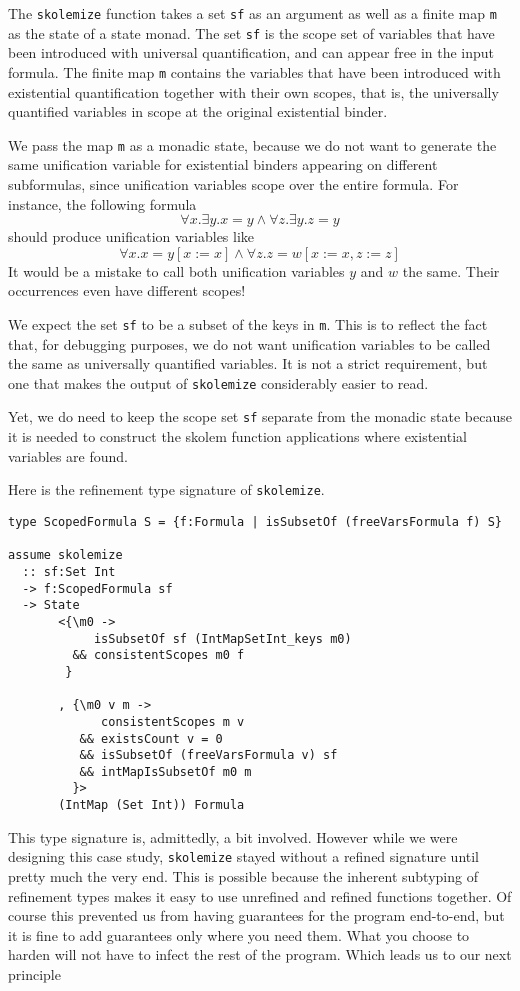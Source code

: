 \documentclass[sigconf, review]{acmart}
\newcommand{\tc}[1]{{\small\texttt{#1}}}
\begin{document}
The \tc{skolemize} function takes a set \tc{sf} as an argument as well as a
finite map \tc{m} as the state of a state monad. The set \tc{sf} is the scope set
of variables that have been
introduced with universal quantification, and can appear free in the
input formula. The finite map \tc{m} contains the variables
that have been introduced with existential quantification together with their own
scopes, that is, the universally quantified variables in scope at the original existential
binder.

We pass the map \tc{m} as a monadic state, because we do not
want to generate the same unification variable for existential binders appearing
on different subformulas, since unification variables scope over the entire formula. For instance, the following formula
$$\forall x. \exists y. x = y \land \forall z. \exists y. z = y$$
should produce unification variables like
$$\forall x. x = y[x:=x] \land \forall z. z = w[x:=x, z:=z]$$
It would be a mistake to call both unification variables $y$ and $w$ the same.
Their occurrences even have different scopes!

We expect the set \tc{sf} to be a subset of the keys in \tc{m}. This is to reflect the
fact that, for debugging purposes, we do not want unification variables to be called the same as
universally quantified variables. It is not a strict requirement, but one
that makes the output of \tc{skolemize} considerably easier to read.

Yet, we do need to keep the scope set \tc{sf} separate from the monadic
state because it is needed to construct the skolem function applications where
existential variables are found.

Here is the refinement type signature of \tc{skolemize}.
\begin{verbatim}
type ScopedFormula S = {f:Formula | isSubsetOf (freeVarsFormula f) S}

assume skolemize
  :: sf:Set Int
  -> f:ScopedFormula sf
  -> State
       <{\m0 ->
            isSubsetOf sf (IntMapSetInt_keys m0)
         && consistentScopes m0 f
        }

       , {\m0 v m ->
             consistentScopes m v
          && existsCount v = 0
          && isSubsetOf (freeVarsFormula v) sf
          && intMapIsSubsetOf m0 m
         }>
       (IntMap (Set Int)) Formula
\end{verbatim}

This type signature is, admittedly, a bit involved. However while we were
designing this case study, \tc{skolemize} stayed without a refined signature
until pretty much the very end. This is possible because the inherent subtyping
of refinement types makes it easy to use unrefined and refined functions together.
Of course this prevented us from having guarantees for the program end-to-end,
but it is fine to add guarantees only where you need them. What you choose
to harden will not have to infect the rest of the program.
Which leads us to our next principle
\end{document}
